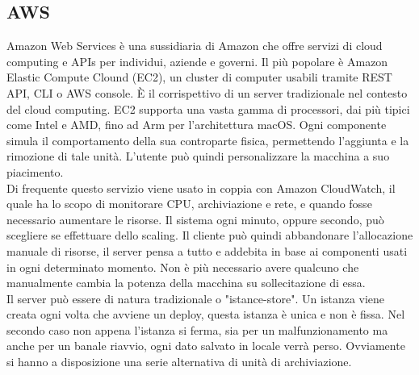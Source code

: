 \documentclass[12pt]{article}
\begin{document}
\subsection{AWS}
Amazon Web Services è una sussidiaria di Amazon che offre servizi di cloud 
computing e APIs per individui, aziende e governi.
Il più popolare è Amazon Elastic Compute Clound (EC2), 
un cluster di computer usabili tramite REST API, CLI o AWS console.
È il corrispettivo di un server tradizionale nel contesto del cloud computing. 
EC2 supporta una vasta gamma di processori, dai più tipici come Intel e AMD, 
fino ad Arm per l'architettura macOS.
Ogni componente simula il comportamento della sua controparte fisica, permettendo 
l'aggiunta e la rimozione di tale unità. 
L'utente può quindi personalizzare la macchina a suo piacimento. 
\\ Di frequente questo servizio viene usato in coppia con Amazon CloudWatch,
il quale ha lo scopo di monitorare CPU, archiviazione e rete, e quando fosse 
necessario aumentare le risorse.
Il sistema ogni minuto, oppure secondo, può scegliere se effettuare dello 
scaling.
Il cliente può quindi abbandonare l'allocazione manuale di risorse, il server 
pensa a tutto e addebita in base ai componenti usati in ogni determinato momento. 
Non è più necessario avere qualcuno che manualmente cambia la potenza della 
macchina su sollecitazione di essa.
\\ Il server può essere di natura tradizionale o "istance-store". 
Un istanza viene creata ogni volta che avviene un deploy, questa istanza è 
unica e non è fissa.
Nel secondo caso non appena l'istanza si ferma, sia per un malfunzionamento 
ma anche per un banale riavvio, ogni dato salvato in locale verrà perso. 
Ovviamente si hanno a disposizione una serie alternativa di unità di archiviazione.
\end{document}
